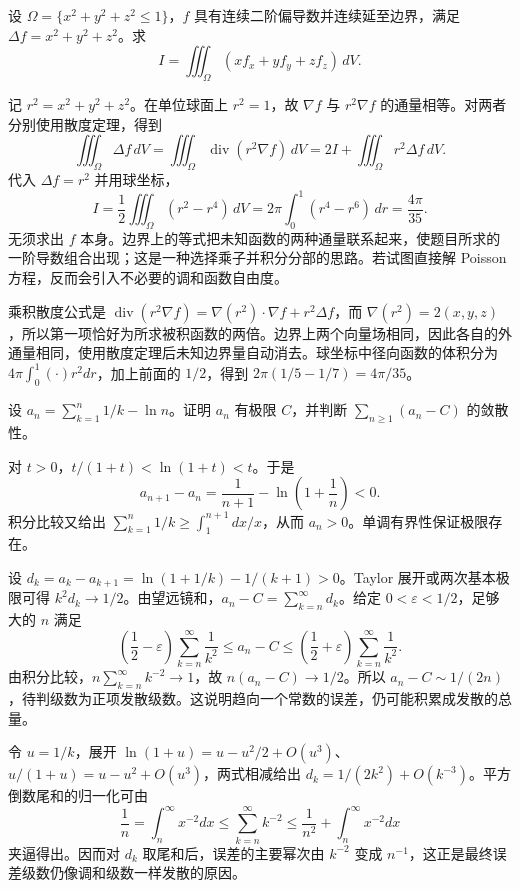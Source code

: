 \documentclass[12pt,fontset=fandol]{ctexart}
\begin{document}
\begin{example}\label{nm-final8-4}
设 $\Omega=\{x^2+y^2+z^2\leq1\}$，$f$ 具有连续二阶偏导数并连续延至边界，满足 $\Delta f=x^2+y^2+z^2$。求
\[
 I=\iiint_\Omega(xf_x+yf_y+zf_z)\,dV.
\]
\end{example}
\begin{solve}
记 $r^2=x^2+y^2+z^2$。在单位球面上 $r^2=1$，故 $\nabla f$ 与 $r^2\nabla f$ 的通量相等。对两者分别使用散度定理，得到
\[
 \iiint_\Omega\Delta f\,dV
 =\iiint_\Omega\operatorname{div}(r^2\nabla f)\,dV
 =2I+\iiint_\Omega r^2\Delta f\,dV.
\]
代入 $\Delta f=r^2$ 并用球坐标，
\[
 I=\frac12\iiint_\Omega(r^2-r^4)\,dV
 =2\pi\int_0^1(r^4-r^6)\,dr
 =\frac{4\pi}{35}.
\]
无须求出 $f$ 本身。边界上的等式把未知函数的两种通量联系起来，使题目所求的一阶导数组合出现；这是一种选择乘子并积分分部的思路。若试图直接解 Poisson 方程，反而会引入不必要的调和函数自由度。

乘积散度公式是 $\operatorname{div}(r^2\nabla f)=\nabla(r^2)\cdot\nabla f+r^2\Delta f$，而 $\nabla(r^2)=2(x,y,z)$，所以第一项恰好为所求被积函数的两倍。边界上两个向量场相同，因此各自的外通量相同，使用散度定理后未知边界量自动消去。球坐标中径向函数的体积分为 $4\pi\int_0^1(\cdot)r^2dr$，加上前面的 $1/2$，得到 $2\pi(1/5-1/7)=4\pi/35$。

\end{solve}

\begin{example}\label{nm-final8-6}
设 $a_n=\sum_{k=1}^n1/k-\ln n$。证明 $a_n$ 有极限 $C$，并判断 $\sum_{n\geq1}(a_n-C)$ 的敛散性。
\end{example}
\begin{solve}
对 $t>0$，$t/(1+t)<\ln(1+t)<t$。于是
\[
 a_{n+1}-a_n=\frac1{n+1}-\ln\left(1+\frac1n\right)<0.
\]
积分比较又给出 $\sum_{k=1}^n1/k\geq\int_1^{n+1}dx/x$，从而 $a_n>0$。单调有界性保证极限存在。

设 $d_k=a_k-a_{k+1}=\ln(1+1/k)-1/(k+1)>0$。Taylor 展开或两次基本极限可得 $k^2d_k\to1/2$。由望远镜和，$a_n-C=\sum_{k=n}^\infty d_k$。给定 $0<\varepsilon<1/2$，足够大的 $n$ 满足
\[
 \left(\frac12-\varepsilon\right)\sum_{k=n}^\infty\frac1{k^2}
 \leq a_n-C\leq
 \left(\frac12+\varepsilon\right)\sum_{k=n}^\infty\frac1{k^2}.
\]
由积分比较，$n\sum_{k=n}^\infty k^{-2}\to1$，故 $n(a_n-C)\to1/2$。所以 $a_n-C\sim1/(2n)$，待判级数为正项发散级数。这说明趋向一个常数的误差，仍可能积累成发散的总量。

令 $u=1/k$，展开 $\ln(1+u)=u-u^2/2+O(u^3)$、$u/(1+u)=u-u^2+O(u^3)$，两式相减给出 $d_k=1/(2k^2)+O(k^{-3})$。平方倒数尾和的归一化可由
\[
\frac1n=\int_n^\infty x^{-2}dx\le\sum_{k=n}^\infty k^{-2}
\le\frac1{n^2}+\int_n^\infty x^{-2}dx
\]
夹逼得出。因而对 $d_k$ 取尾和后，误差的主要幂次由 $k^{-2}$ 变成 $n^{-1}$，这正是最终误差级数仍像调和级数一样发散的原因。

\end{solve}
\end{document}
